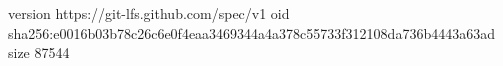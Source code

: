 version https://git-lfs.github.com/spec/v1
oid sha256:e0016b03b78c26c6e0f4eaa3469344a4a378c55733f312108da736b4443a63ad
size 87544
